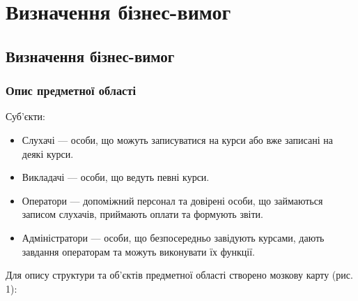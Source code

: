 \newpage
\section{Визначення бізнес-вимог}
\subsection{Визначення бізнес-вимог}
\subsubsection{Опис предметної області}
\bigbreak
Суб'єкти:

\begin{itemize}
\item Слухачі --- особи, що можуть записуватися на курси або вже записані на деякі курси.
\item Викладачі --- особи, що ведуть певні курси.
\item Оператори --- допоміжний персонал та довірені особи, що займаються записом слухачів, приймають оплати та формують звіти.
\item Адміністратори --- особи, що безпосередньо завідують курсами, дають завдання операторам та можуть виконувати їх функції.
\end{itemize}

Для опису структури та об'єктів предметної області створено мозкову карту (рис. 1):

